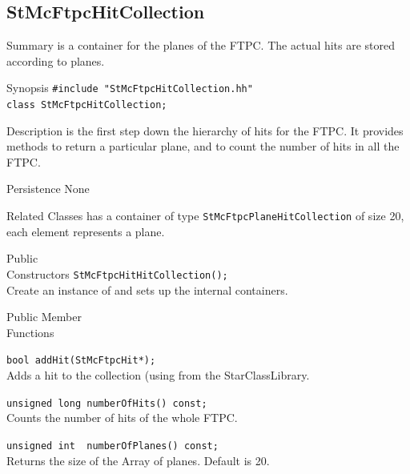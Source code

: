 \subsection{StMcFtpcHitCollection}
 
\label{sec:StMcFtpcHitCollection}
\begin{Entry}
\item[Summary]
     is a container for the
    planes of the FTPC.  The actual hits are stored according to
    planes.

\item[Synopsis]
    \verb+#include "StMcFtpcHitCollection.hh"+\\
    \verb+class StMcFtpcHitCollection;+\\

\item[Description]
     is the first step down
    the hierarchy of hits for the FTPC.  It provides
    methods to return a particular plane, and to
    count the number of hits in all the FTPC.

\item[Persistence]
    None

\item[Related Classes]
    has a container of type {\tt StMcFtpcPlaneHitCollection}
    of size 20, each element represents a plane.

\item[Public\\ Constructors]
    \verb+StMcFtpcHitHitCollection();+\\
    Create an instance of 
    and sets up the internal containers.

\item[Public Member\\ Functions]

    \verb+bool addHit(StMcFtpcHit*);+\\
    Adds a hit to the collection (using 
    from the StarClassLibrary.

    \verb+unsigned long numberOfHits() const;+\\
    Counts the number of hits of the whole FTPC.

    \verb+unsigned int  numberOfPlanes() const;+\\
    Returns the size of the Array of planes.  Default is 20.


\end{Entry}

